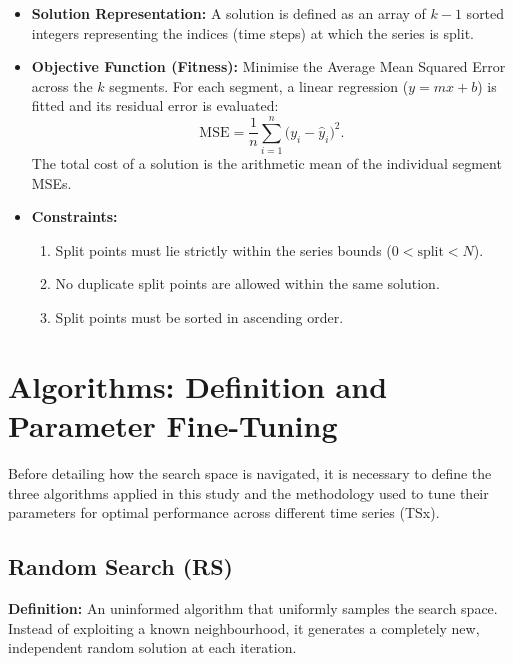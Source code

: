 \documentclass[12pt, a4paper]{article}
\begin{document}
\begin{itemize}[itemsep=0.3em]
  \item \textbf{Solution Representation:} A solution is defined as an array of $k-1$
        sorted integers representing the indices (time steps) at which the series is split.

  \item \textbf{Objective Function (Fitness):} Minimise the Average Mean Squared Error
        across the $k$ segments. For each segment, a linear regression ($y = mx + b$) is
        fitted and its residual error is evaluated:
        \begin{equation}
          \mathrm{MSE} = \frac{1}{n} \sum_{i=1}^{n} \bigl(y_i - \hat{y}_i\bigr)^{2}.
        \end{equation}
        The total cost of a solution is the arithmetic mean of the individual segment MSEs.

  \item \textbf{Constraints:}
        \begin{enumerate}[itemsep=0.2em]
          \item Split points must lie strictly within the series bounds ($0 < \text{split} < N$).
          \item No duplicate split points are allowed within the same solution.
          \item Split points must be sorted in ascending order.
        \end{enumerate}
\end{itemize}

\section{Algorithms: Definition and Parameter Fine-Tuning}

Before detailing how the search space is navigated, it is necessary to define the
three algorithms applied in this study and the methodology used to tune their
parameters for optimal performance across different time series (TSx).

\subsection{Random Search (RS)}
\textbf{Definition:} An uninformed algorithm that uniformly samples the search space.
Instead of exploiting a known neighbourhood, it generates a completely new, independent
random solution at each iteration.
\end{document}
